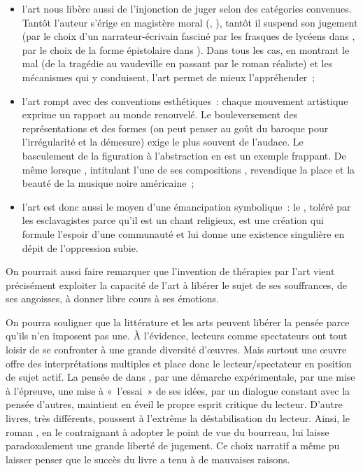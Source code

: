{\begin{itemize}
\item l'art nous libère aussi de l'injonction de juger selon des catégories convenues. Tantôt
l'auteur s'érige en magistère moral (, ), tantôt il suspend son jugement
(par le choix d'un narrateur-écrivain fasciné par les frasques de lycéens dans
, par le choix de la forme épistolaire dans ). Dans tous les cas, en montrant le mal (de la tragédie au vaudeville en
passant par le roman réaliste) et les mécanismes qui y conduisent, l'art permet de
mieux l'appréhender~;

\item l'art rompt avec des conventions esthétiques~: chaque mouvement artistique exprime
un rapport au monde renouvelé. Le bouleversement des représentations et des formes
(on peut penser au goût du baroque pour l'irrégularité et la démesure) exige le plus
souvent de l'audace. Le basculement de la figuration à l'abstraction en est un exemple
frappant. De même lorsque , intitulant l'une de ses compositions
, revendique la place et la beauté de la musique noire américaine~;

\item l'art est donc aussi le moyen d'une émancipation symbolique~: le , toléré par
les esclavagistes parce qu'il est un chant religieux, est une création qui formule l'espoir
d'une communauté et lui donne une existence singulière en dépit de l'oppression
subie.
\end{itemize}

On pourrait aussi faire remarquer que l'invention de thérapies par l'art vient
précisément exploiter la capacité de l'art à libérer le sujet de ses souffrances, de ses
angoisses, à donner libre cours à ses émotions.

On pourra souligner que la littérature et les arts peuvent libérer la pensée parce
qu'ils n'en imposent pas une. À l'évidence, lecteurs comme spectateurs ont tout loisir
de se confronter à une grande diversité d'œuvres. Mais surtout une œuvre offre des
interprétations multiples et place donc le lecteur/spectateur en position de sujet actif.
La pensée de  dans , par une démarche expérimentale, par une
mise à l'épreuve, une mise à «~l'essai~» de ses idées, par un dialogue constant avec
la pensée d'autres, maintient en éveil le propre esprit critique du lecteur. D'autre livres,
très différents, poussent à l'extrême la déstabilisation du lecteur. Ainsi, le roman ,
en le contraignant à adopter le point de vue du bourreau, lui laisse
paradoxalement une grande liberté de jugement. Ce choix narratif a même pu laisser
penser que le succès du livre a tenu à de mauvaises raisons.

}
